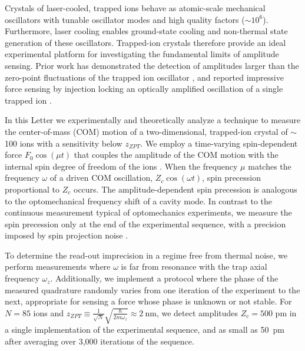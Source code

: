 \documentclass[aps,prl,twocolumn,superscriptaddress,floatfix]{revtex4-1}
\begin{document}
Crystals of laser-cooled, trapped ions behave as atomic-scale mechanical oscillators \citep{Jost2009,Biercuk2010,Sawyer2012} with tunable oscillator modes and high quality factors ($ {\sim} 10^6$). Furthermore, laser cooling enables ground-state cooling and non-thermal state generation of these oscillators. Trapped-ion crystals therefore provide an ideal experimental platform for investigating the fundamental limits of amplitude sensing. Prior work has demonstrated the detection of amplitudes larger than the zero-point fluctuations of the trapped ion oscillator \citep{Biercuk2010,Sawyer2012,Shaniv2016}, and reported impressive force sensing by injection locking an optically amplified oscillation of a single trapped ion \citep{Knunz2010}.

In this Letter we experimentally and theoretically analyze a technique to measure the center-of-mass (COM) motion of a two-dimensional, trapped-ion crystal of $\sim$100 ions with a sensitivity below $z_{ZPT}$. We employ a time-varying spin-dependent force $F_0\cos\left(\mu t\right)$ that couples the amplitude of the COM motion with the internal spin degree of freedom of the ions \citep{Bollinger2013,Sawyer2014,Ivanov2016}. When the frequency $\mu$ matches the frequency $\omega$ of a driven COM oscillation, $Z_{c}\cos\left(\omega t\right)$, spin precession proportional to $Z_{c}$ occurs. The amplitude-dependent spin precession is analogous to the optomechanical frequency shift of a cavity mode. In contrast to the continuous measurement typical of optomechanics experiments, we measure the spin precession only at the end of the experimental sequence, with a precision imposed by spin projection noise \citep{Itano1993}.

To determine the read-out imprecision in a regime free from thermal noise, we perform measurements where $\omega$ is far from resonance with the trap axial frequency $\omega_z$. Additionally, we implement a protocol where the phase of the measured quadrature randomly varies from one iteration of the experiment to the next, appropriate for sensing a force whose phase is unknown or not stable. For $N = 85$ ions and $z_{ZPT} \equiv \frac{1}{\sqrt{N}}\sqrt{\frac{\hbar}{2m\omega_z}} \approx 2\:\mathrm{nm}$, we detect amplitudes $Z_c=500$ pm in a single implementation of the experimental sequence, and as small as 50~pm after averaging over 3,000 iterations of the sequence.
\end{document}
